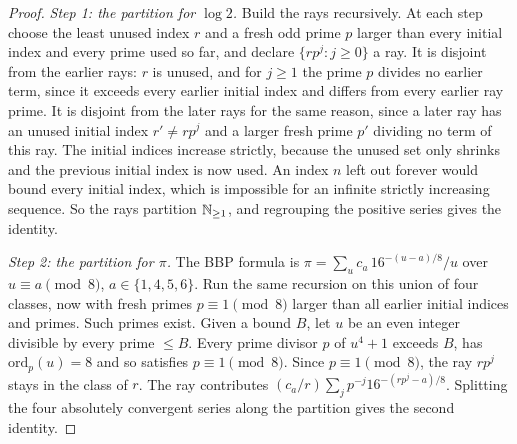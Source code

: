 \documentclass[11pt]{article}
\begin{document}
\begin{proof}
\emph{Step 1: the partition for $\log 2$.} Build the rays recursively. At each step choose the least unused index $r$ and a fresh odd prime $p$ larger than every initial index and every prime used so far, and declare $\{rp^j:j\ge0\}$ a ray. It is disjoint from the earlier rays: $r$ is unused, and for $j\ge1$ the prime $p$ divides no earlier term, since it exceeds every earlier initial index and differs from every earlier ray prime. It is disjoint from the later rays for the same reason, since a later ray has an unused initial index $r'\ne rp^j$ and a larger fresh prime $p'$ dividing no term of this ray. The initial indices increase strictly, because the unused set only shrinks and the previous initial index is now used. An index $n$ left out forever would bound every initial index, which is impossible for an infinite strictly increasing sequence. So the rays partition $\mathbb N_{\ge1}$, and regrouping the positive series gives the identity.

\emph{Step 2: the partition for $\pi$.} The BBP formula is $\pi=\sum_{u}c_a\,16^{-(u-a)/8}/u$ over $u\equiv a\pmod8$, $a\in\{1,4,5,6\}$. Run the same recursion on this union of four classes, now with fresh primes $p\equiv1\pmod8$ larger than all earlier initial indices and primes. Such primes exist. Given a bound $B$, let $u$ be an even integer divisible by every prime $\le B$. Every prime divisor $p$ of $u^4+1$ exceeds $B$, has $\mathrm{ord}_p(u)=8$ and so satisfies $p\equiv1\pmod 8$. Since $p\equiv1\pmod8$, the ray $rp^j$ stays in the class of $r$. The ray contributes $(c_a/r)\sum_jp^{-j}16^{-(rp^j-a)/8}$. Splitting the four absolutely convergent series along the partition gives the second identity.


\end{proof}
\end{document}
